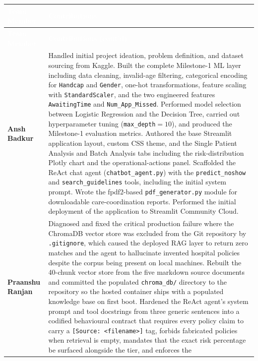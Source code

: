\documentclass[11pt,a4paper]{article}
\newcommand{\hdrrow}[1]{\textcolor{white}{\textbf{#1}}}
\newcommand{\hdrline}{\rowcolor{navy}}
\begin{document}
\renewcommand{\arraystretch}{1.35}
\setlength{\LTpre}{0pt}
\setlength{\LTpost}{0pt}
\begin{longtable}{|>{\raggedright\arraybackslash}p{}|>{\raggedright\arraybackslash}p{}|}
\hline
\hdrline \hdrrow{Team Member} & \hdrrow{Contributions} \\ \hline
\endfirsthead
\hline
\hdrline \hdrrow{Team Member} & \hdrrow{Contributions (cont'd)} \\ \hline
\endhead
\textbf{Ansh Badkur} &
Handled initial project ideation, problem definition, and dataset
sourcing from Kaggle. Built the complete Milestone-1 ML layer including
data cleaning, invalid-age filtering, categorical encoding for
\texttt{Handcap} and \texttt{Gender}, one-hot transformations, feature
scaling with \texttt{StandardScaler}, and the two engineered features
\texttt{AwaitingTime} and \texttt{Num\_App\_Missed}. Performed model
selection between Logistic Regression and the Decision Tree, carried out
hyperparameter tuning (\texttt{max\_depth}$=10$), and produced the
Milestone-1 evaluation metrics. Authored the base Streamlit application
layout, custom CSS theme, and the Single Patient Analysis and Batch
Analysis tabs including the risk-distribution Plotly chart and the
operational-actions panel. Scaffolded the ReAct chat agent
(\texttt{chatbot\_agent.py}) with the \texttt{predict\_noshow} and
\texttt{search\_guidelines} tools, including the initial system prompt.
Wrote the fpdf2-based \texttt{pdf\_generator.py} module for
downloadable care-coordination reports. Performed the initial deployment
of the application to Streamlit Community Cloud.\\ \hline
\textbf{Praanshu Ranjan} &
Diagnosed and fixed the critical production failure where the ChromaDB
vector store was excluded from the Git repository by
\texttt{.gitignore}, which caused the deployed RAG layer to return zero
matches and the agent to hallucinate invented hospital policies despite
the corpus being present on local machines. Rebuilt the 40-chunk vector
store from the five markdown source documents and committed the
populated \texttt{chroma\_db/} directory to the repository so the hosted
container ships with a populated knowledge base on first boot.
Hardened the ReAct agent's system prompt and tool docstrings from three
generic sentences into a codified behavioural contract that requires
every policy claim to carry a \texttt{[Source: <filename>]} tag, forbids
fabricated policies when retrieval is empty, mandates that the exact risk
percentage be surfaced alongside the tier, and enforces the

\end{longtable}
\end{document}
